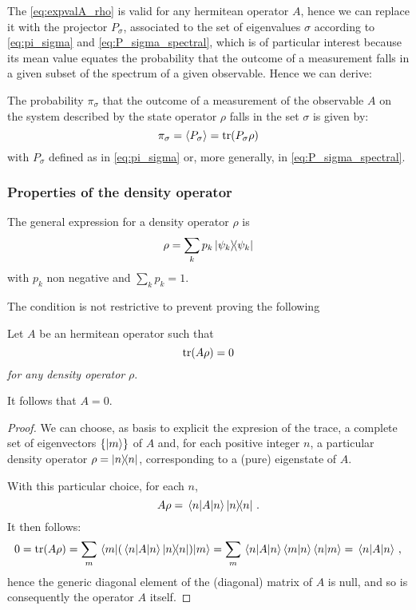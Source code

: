 The \eqref{eq:expvalA_rho} is valid for any hermitean operator $A$,
hence we can replace it with the projector $P_{\sigma}$,
associated to the set of eigenvalues $\sigma$
according to \eqref{eq:pi_sigma} and \eqref{eq:P_sigma_spectral},
which is of particular interest
because its mean value equates the probability that the outcome of a measurement
falls in a given subset of the spectrum of a given observable.
Hence we can derive:

\begin{proposition}\label{probability_rho}
  The probability $\pi_{\sigma}$
  that the outcome of a measurement of the observable $A$
  on the system described by the state operator $\rho$
  falls in the set $\sigma$
  is given by:
  \begin{equation}\label{eq:probability_rho}
    \pi_{\sigma} = \expval{P_{\sigma}} = \tr(P_{\sigma}\rho)
  \end{equation}
  with $P_{\sigma}$ defined as in \eqref{eq:pi_sigma}
  or, more generally, in \eqref{eq:P_sigma_spectral}.
\end{proposition}

\subsubsection{Properties of the density operator}
The general expression for a density operator $\rho$ is
$$
  \rho = \sum_{k}p_{k}\ketbra{\psi_{k}}
$$
with $p_{k}$ non negative and $\sum_{k}p_{k} = 1$.

The condition is not restrictive to prevent proving the following
\begin{proposition}
  Let $A$ be an hermitean operator such that
  $$
    \tr(A\rho) = 0 
  $$
  \emph{for any density operator} $\rho$.

  It follows that $A = 0$.

  \begin{proof}
    We can choose,
    as basis to explicit the expresion of the trace,
    a complete set of eigenvectors $\{\ket{m}\}$ of $A$ and,
    for each positive integer $n$,
    a particular density operator $\rho = \ketbra{n}$,
    corresponding to a (pure) eigenstate of $A$.

    With this particular choice,
    for each $n$,
    $$
      A\rho = \mel{n}{A}{n}\ketbra{n}\,.
    $$
    It then follows:
    $$
      0 = \tr(A\rho) = \sum_{m}\mel{m}{ ( \mel{n}{A}{n}\ketbra{n} ) }{m}
        = \sum_{m} \mel{n}{A}{n} \braket{m}{n} \braket{n}{m}
        = \mel{n}{A}{n}\,,
    $$
    hence the generic diagonal element of the (diagonal) matrix of $A$ is null,
    and so is consequently the operator $A$ itself.
  \end{proof}
\end{proposition}
